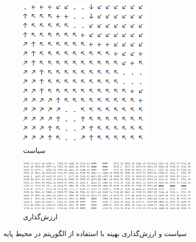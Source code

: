 \documentclass[12pt, a4paper]{article}
\begin{document}
\begin{figure}[h]
    \begin{subfigure}{\linewidth}
        \centering
        \includegraphics{images/q4/e/base/policy.png}
        \caption{سیاست}
    \end{subfigure}
    \newline
    \begin{subfigure}{\linewidth}
        \centering
        \includegraphics[width=\linewidth]{images/q4/e/base/value.png}
        \caption{ارزش‌گذاری}
    \end{subfigure}
    \caption{سیاست و ارزش‌گذاری بهینه با استفاده از الگوریتم  در محیط پایه}
    \label{value_iter_base}
\end{figure}

\clearpage
\end{document}
